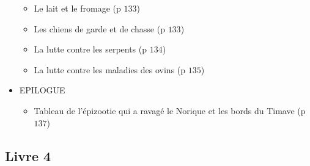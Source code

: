 \documentclass[a4paper, 11pt, hidelinks]{article}
\begin{document}
\begin{itemize}
\begin{itemize}
        \item Le lait et le fromage (p $133$)
        \item Les chiens de garde et de chasse (p $133$)
        \item La lutte contre les serpents (p $134$)
        \item La lutte contre les maladies des ovins (p $135$)
    \end{itemize}
    \item EPILOGUE \begin{itemize} 
        \item Tableau de l'épizootie qui a ravagé le Norique et les bords du Timave (p $137$)
    \end{itemize}
\end{itemize}



\subsection{Livre 4}
\end{document}
